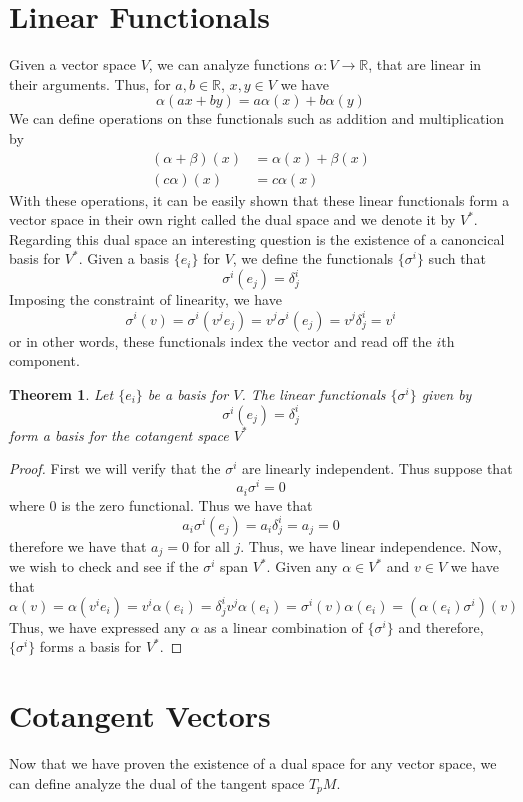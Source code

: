 \documentclass[a4paper]{article}
\newtheorem*{thm}{Theorem}
\begin{document}
\section*{Linear Functionals}%
Given a vector space $V$, we can analyze functions $\alpha: V \rightarrow \mathds{R}$, that are linear in their arguments. Thus, for $a,b \in \mathds{R}$, $x,y \in V$ we have
\[
  \alpha(a x + b y) = a \alpha(x) + b \alpha(y)
\]
We can define operations on thse functionals such as addition and multiplication by
\[
  \begin{aligned}
    (\alpha + \beta)(x) &= \alpha(x) + \beta(x) \\
    (c\alpha)(x) &= c\alpha(x)
  \end{aligned}
\]
With these operations, it can be easily shown that these linear functionals form a vector space in their own right called the dual space and we denote it by $V^*$. Regarding this dual space an interesting question is the existence of a canoncical basis for $V^*$. Given a basis $\{e_i\}$ for $V$, we define the functionals $\{\sigma^i\}$ such that
\[
  \sigma^i(e_j) = \delta^i_j
\]
Imposing the constraint of linearity, we have
\[
  \sigma^i(v) = \sigma^i \left( v^je_j \right) = v^j\sigma^i(e_j) = v^j \delta_j^i = v^i
\]
or in other words, these functionals index the vector and read off the $i$th component. 

\begin{thm}
  Let $\{e_i\}$ be a basis for $V$. The linear functionals $\{\sigma^i\}$ given by 
  \[
    \sigma^i(e_j) = \delta^i_j
  \]
  form a basis for the cotangent space $V^*$
\end{thm}

\begin{proof}
  First we will verify that the $\sigma^i$ are linearly independent. Thus suppose that
  \[
    a_i \sigma^i = 0
  \]
  where $0$ is the zero functional. Thus we have that
  \[
    a_i \sigma^i(e_j) = a_i \delta^i_j = a_j = 0
  \]
  therefore we have that $a_j = 0$ for all $j$. Thus, we have linear independence. Now, we wish to check and see if the $\sigma^i$ span $V^*$. Given any $\alpha \in V^*$ and $v \in V$ we have that
  \[
    \alpha(v) =  \alpha(v^ie_i) = v^i\alpha(e_i) = \delta_j^iv^j \alpha(e_i) = \sigma^i(v) \alpha(e_i) = (\alpha(e_i)\sigma^i)(v)
  \]
  Thus, we have expressed any $\alpha$ as a linear combination of $\{\sigma^i\}$ and therefore, $\{\sigma^i\}$ forms a basis for $V^*$.
\end{proof}

\section*{Cotangent Vectors}%
Now that we have proven the existence of a dual space for any vector space, we can define analyze the dual of the tangent space $T_pM$.
\end{document}
